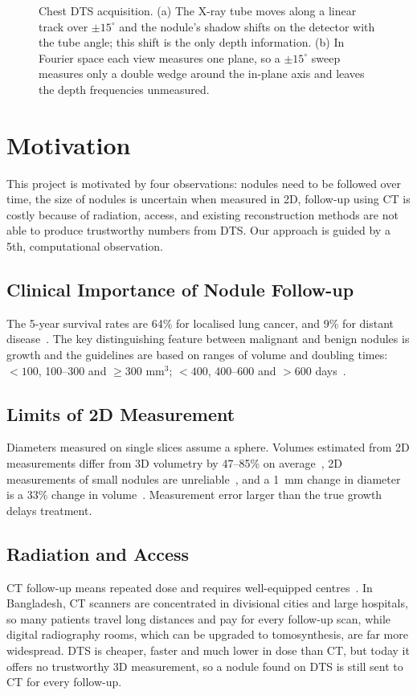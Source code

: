 \begin{figure}[htbp]
  \centering
  \resizebox{\linewidth}{!}{}
  \caption[DTS acquisition geometry and the missing wedge]{Chest DTS acquisition. (a) The X-ray tube moves along a linear track over $\pm15^\circ$ and the nodule's shadow shifts on the detector with the tube angle; this shift is the only depth information. (b) In Fourier space each view measures one plane, so a $\pm15^\circ$ sweep measures only a double wedge around the in-plane axis and leaves the depth frequencies unmeasured.}
  \label{fig:dts}
\end{figure}

\section{Motivation}

This project is motivated by four observations: nodules need to be followed over time, the size of nodules is uncertain when measured in 2D, follow-up using CT is costly because of radiation, access, and existing reconstruction methods are not able to produce trustworthy numbers from DTS. Our approach is guided by a 5th, computational observation.

\subsection{Clinical Importance of Nodule Follow-up}
The 5-year survival rates are 64\% for localised lung cancer, and 9\% for distant disease~\cite{who2023lung,nlst2011}. The key distinguishing feature between malignant and benign nodules is growth and the guidelines are based on ranges of volume and doubling times: $<100$, 100--300 and $\geq$300 mm$^3$; $<400$, 400--600 and $>600$ days~\cite{horeweg2014nelson,oudkerk2017eups}.

\subsection{Limits of 2D Measurement}
 Diameters measured on single slices assume a sphere. Volumes estimated from 2D measurements differ from 3D volumetry by 47--85\% on average~\cite{demargerie2018}, 2D measurements of small nodules are unreliable~\cite{revel2004twod}, and a 1~mm change in diameter is a 33\% change in volume~\cite{lee2025volumetry}. Measurement error larger than the true growth delays treatment.

\subsection{Radiation and Access}
 CT follow-up means repeated dose and requires well-equipped centres~\cite{mascalchi2017,brenner2007ct}. In Bangladesh, CT scanners are concentrated in divisional cities and large hospitals, so many patients travel long distances and pay for every follow-up scan, while digital radiography rooms, which can be upgraded to tomosynthesis, are far more widespread. DTS is cheaper, faster and much lower in dose than CT, but today it offers no trustworthy 3D measurement, so a nodule found on DTS is still sent to CT for every follow-up.

